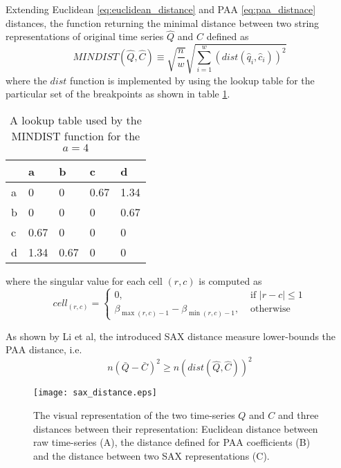 Extending Euclidean \ref{eq:euclidean_distance} and PAA \ref{eq:paa_distnace} distances, the function returning the minimal distance between two string representations of original time series $\hat{Q}$ and $\hat{C}$ defined as
\begin{equation}
MINDIST(\hat{Q},\hat{C}) \equiv \sqrt{ \frac{n}{w} } \sqrt{ \sum_{i=1}^{w} ( dist( \hat{q}_{i}, \hat{c}_{i} ) )^{2}}
\label{eq:sax_mindist}
\end{equation} 
where the $dist$ function is implemented by using the lookup table for the particular set of the breakpoints as shown in table \ref{tbl:sax_lookup}.

\begin{table}
\begin{tabularx}{400pt}{X X X X X}
\hline
   & a   & b    & c    & d    \\
\hline
a & 0    & 0    & 0.67 & 1.34 \\
b & 0    & 0    & 0    & 0.67 \\
c & 0.67 & 0    & 0    & 0    \\
d & 1.34 & 0.67 & 0    & 0    \\
\hline
\end{tabularx}
\caption{A lookup table used by the MINDIST function for the $a=4$}
\label{tbl:sax_lookup}
\end{table}
where the singular value for each cell $(r,c)$ is computed as 
\begin{equation}
cell_{(r,c)} = 
\begin{cases} 
0, & \text{ if }\left| r-c \right| \leq 1 \\
\beta_{\max(r,c) - 1} - \beta_{\min(r,c) - 1}, & \text{ otherwise}
\end{cases}
\label{eq:cell}
\end{equation}

As shown by Li et al, the introduced SAX distance measure lower-bounds the PAA distance, i.e.
\begin{equation}
n(\bar{Q} - \bar{C})^{2} \geq n(dist(\hat{Q},\hat{C}))^2
\label{eq:}
\end{equation}

\begin{figure}[tbp]
   \centering
   \texttt{[image: sax\_distance.eps]}
   \caption{The visual representation of the two time-series $Q$ and $C$ and three distances between their representation: Euclidean distance between raw time-series (A), the distance defined for PAA coefficients (B) and the distance between two SAX representations (C).}
   \label{fig:sax_distance}
\end{figure}
